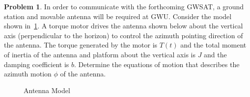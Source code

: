 \documentclass[10pt]{article}
\theoremstyle{definition}
\newtheorem{prob}{Problem}[section]
\begin{document}
\begin{prob}
    In order to communicate with the forthcoming GWSAT, a ground station and movable antenna will be required at GWU.
    Consider the model shown in~\cref{fig:antenna}.
    A torque motor drives the antenna shown below about the vertical axis (perpendicular to the horizon) to control the azimuth pointing direction of the antenna.
    The torque generated by the motor is \( T(t) \) and the total moment of inertia of the antenna and platform about the vertical axis is \( J \) and the damping coefficient is \( b\).
    Determine the equations of motion that describes the azimuth motion \( \phi\) of the antenna.

    \begin{figure}[h]
        \centering
        \begin{scaletikzpicturetowidth}{0.25\textwidth}

        \end{scaletikzpicturetowidth}
        \caption{Antenna Model~\label{fig:antenna}}
    \end{figure}
\end{prob}
\end{document}
